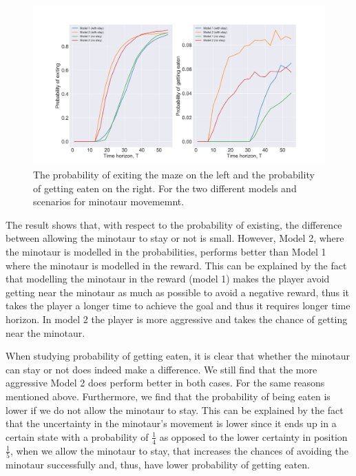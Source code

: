 \documentclass{article}
\begin{document}
\begin{figure}[ht]
  \centering

  \includegraphics[width=\linewidth]{img/1b.png}
  \caption{The probability of exiting the maze on the left and the probability of getting eaten on the right. For the two different models and scenarios for minotaur movememnt.}
  \label{fig:1b}
\end{figure}

The result shows that, with respect to the probability of existing, the difference between allowing the minotaur to stay or not is small. However, Model 2, where the minotaur is modelled in the probabilities, performs better than Model 1 where the minotaur is modelled in the reward. This can be explained by the fact that modelling the minotaur in the reward (model 1) makes the player avoid getting near the minotaur as much as possible to avoid a negative reward, thus it takes the player a longer time to achieve the goal and thus it requires longer time horizon. In model 2 the player is more aggressive and takes the chance of getting near the minotaur.

When studying probability of getting eaten, it is clear that whether the minotaur can stay or not does indeed make a difference. We still find that the more aggressive Model 2 does perform better in both cases. For the same reasons mentioned above. Furthermore, we find that the probability of being eaten is lower if we do not allow the minotaur to stay. This can be explained by the fact that the uncertainty in the minotaur's movement is lower since it ends up in a certain state with a probability of $\frac{1}{4}$ as opposed to the lower certainty in position $\frac{1}{5}$, when we allow the minotaur to stay, that increases the chances of avoiding the minotaur successfully and, thus, have lower probability of getting eaten.
\end{document}
